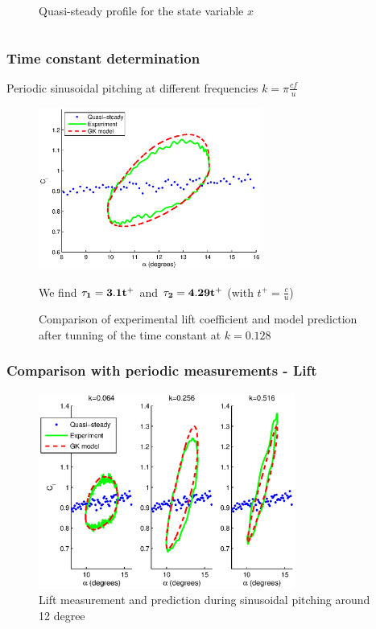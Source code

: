 \documentclass[compress]{beamer}
\begin{document}
\begin{frame}
\begin{columns}
\begin{figure}[ht]
\begin{center}
      \end{center}
      \caption{Quasi-steady profile for the state variable $x$}
    \end{figure}
  \end{columns}
\end{frame}

\begin{frame}
  \frametitle{Time constant determination}
  Periodic sinusoidal pitching at different frequencies $k=\pi \frac{c f}{u}$

  \begin{figure}[h]
    \begin{center}
      \includegraphics[width=0.65\textwidth]{./Figures/Cl_u=3_meanaoa=12_amp=2_freq=0p5.eps}
    \end{center}
    \caption{Comparison of experimental lift coefficient and model prediction after tunning of the time constant at $k=0.128$}

    We find $\bold{\tau_1=3.1t^+}$ and $\bold{\tau_2=4.29t^+}$ (with $t^+=\frac{c}{u}$)
  \end{figure}
\end{frame}

\begin{frame}
  \frametitle{Comparison with periodic measurements - Lift }

  \begin{figure}[h]
    \begin{center}
      \includegraphics[width=0.75\textwidth]{./Figures/Pitching_allcases_GK_CL_12_amp_2.eps}
    \end{center}
    \caption{Lift measurement and prediction during sinusoidal pitching around 12 degree} 
  \end{figure}
\end{frame}
\end{document}

